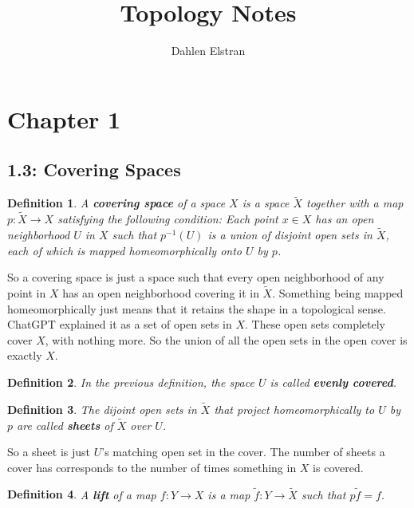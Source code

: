 \documentclass[12pt]{article}
\newtheorem{definition}{Definition}
\begin{document}
 
\title{Topology Notes} 
\author{Dahlen Elstran} 
\maketitle

\section*{Chapter 1}

\subsection*{1.3: Covering Spaces}

\begin{definition}
  A \textbf{covering space} of a space $X$ is a space $\tilde{X}$ together with a map $p: \tilde{X} \to X$ satisfying the following condition: 
  Each point $x \in X$ has an open neighborhood $U$ in $X$ such that $p^{-1}(U)$ is a union of disjoint open sets in $\tilde{X}$, 
  each of which is mapped homeomorphically onto $U$ by $p$.
\end{definition}

So a covering space is just a space such that every open neighborhood of any point in $X$ has an open neighborhood covering it in $\tilde{X}$. 
Something being mapped homeomorphically just means that it retains the shape in a topological sense. ChatGPT explained it as a set of open sets in $X$. 
These open sets completely cover $X$, with nothing more. So the union of all the open sets in the open cover is exactly $X$. 

\begin{definition}
  In the previous definition, the space $U$ is called \textbf{evenly covered}.
\end{definition}

\begin{definition}
  The dijoint open sets in $\tilde{X}$ that project homeomorphically to $U$ by $p$ are called \textbf{sheets} of $\tilde{X}$ over $U$.
\end{definition}

So a sheet is just $U$'s matching open set in the cover. The number of sheets a cover has corresponds to the number of times something in $X$ is covered. 

\begin{definition}
  A \textbf{lift} of a map $f: Y \to X$ is a map $\tilde{f}:Y \to \tilde{X}$ such that $p \tilde{f} = f$. 
\end{definition}
\end{document}
